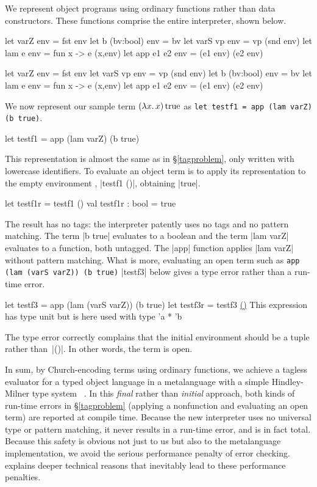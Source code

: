 We represent object programs using ordinary functions rather than
data constructors.  These functions comprise the entire interpreter, shown
below.
\ifshort
\begin{code3}
let varZ env    = fst env         let b (bv:bool) env = bv
let varS vp env = vp (snd env)    let lam e env   = fun x -> e (x,env)
let app e1 e2 env   = (e1 env) (e2 env)
\end{code3}
\else
\begin{code}
let varZ env        = fst env
let varS vp env     = vp (snd env)
let b (bv:bool) env = bv
let lam e env       = fun x -> e (x,env)
let app e1 e2 env   = (e1 env) (e2 env)
\end{code}
\fi
We now represent our sample term $(\mathopen{\lambda\mathord{x}.\,}x)\mathinner{\mathrm{true}}$ as
\ifshort
\texttt{let testf1 = app (lam varZ) (b true)}.
\else
\begin{code}
let testf1 = app (lam varZ) (b true)
\end{code}
\fi
This representation is almost the same as in \S\ref{tagproblem}, only
written with lowercase identifiers. To evaluate an object term is to
apply its representation to the empty environment\ifshort
, |testf1 ()|, obtaining |true|\fi.
\ifshort\else
\begin{code}
let testf1r = testf1 ()
val testf1r : bool = true
\end{code}
\fi
The result has no tags: the interpreter patently uses no tags and no
pattern matching. The term |b true| evaluates to a boolean and the term
|lam varZ| evaluates to a function, both untagged. The |app| function
applies |lam varZ| without pattern matching. What is more, evaluating an
open term such as
\ifshort
\texttt{app (lam (varS varZ)) (b true)}
\else
|testf3| below
\fi
gives a type error rather than a run-time error.
\ifshort\else
\begin{code}[commandchars=\\\{\}]
let testf3 = app (lam (varS varZ)) (b true)
let testf3r = testf3 \underline{()}
This expression has type unit but is here used with type 'a * 'b
\end{code}
\fi
The type error correctly complains
that the initial environment should be a tuple rather than~|()|.
In other words, the term is open.

In sum, by Church\hyp encoding terms using ordinary functions, we
achieve a tagless evaluator for a typed object language in a
metalanguage with a simple 
\ifshort
Hindley-Milner \fi
type system\ifshort\else\ \citep{hindley-principal,milner-theory}\fi
.  In this \emph{final} rather
than \emph{initial} approach, both kinds of run-time errors in
\S\ref{tagproblem} (applying a nonfunction and evaluating an open
term) are reported at compile time. Because the new interpreter
uses no universal type or pattern matching, it never results in a
run-time error, and is in fact total.  Because this safety is obvious
not just to us but also to the metalanguage implementation, we avoid
the serious performance penalty \citep{WalidICFP02} of error checking.
 explains deeper technical reasons that
inevitably lead to these performance penalties.

